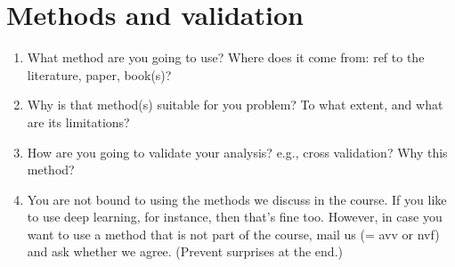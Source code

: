\documentclass[report]{subfiles}
\begin{document}
\section{Methods and validation}
\label{sec:methods-validation}
\begin{enumerate}
\item What method are you going to use?  Where does it come from: ref to the literature, paper, book(s)?
\item Why is that method(s) suitable for you problem? To what extent, and what are its limitations?
\item How are you going to validate your analysis? e.g., cross validation? Why this method?
\item You are not bound to using the methods we discuss in the course.
  If you like to use deep learning, for instance, then that's fine too.
  However, in case you want to use a method that is not part of the course, mail us (= avv or nvf) and ask whether we agree.
  (Prevent surprises at the end.)
\end{enumerate}
\end{document}
